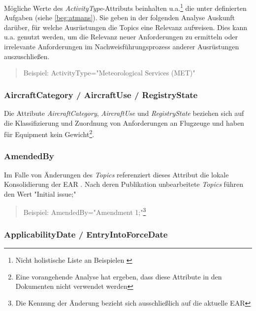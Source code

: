     Mögliche Werte des \textit{ActivityType}-Attributs beinhalten u.a.\footnote{Nicht holistische Liste an Beispielen \cite[vgl.][S.18 -- 19]{easa_xml_doc}} die unter \atmans{} definierten Aufgaben (siehe \ref{beg:atmans}).
    Sie geben in der folgenden Analyse Auskunft darüber, für welche \atmans Ausrüstungen die Topics eine Relevanz aufweisen.
    Dies kann u.a. genutzt werden, um die Relevanz neuer Anforderungen zu ermitteln oder irrelevante Anforderungen im Nachweisführungsprozess anderer Ausrüstungen auszuschließen.  
    
    \begin{quote}
        Beispiel:
        \textsf{ActivityType="Meteorological Services (MET)"}
    \end{quote}
   
\subsubsection{AircraftCategory / AircraftUse / RegistryState}
    
    Die Attribute \textit{AircraftCategory}, \textit{AircraftUse} und \textit{RegistryState} beziehen sich auf die Klassifizierung und Zuordnung von Anforderungen an Flugzeuge und haben für \atmans{} Equipment kein Gewicht\footnote{Eine vorangehende Analyse hat ergeben, dass diese Attribute in den \atmans Dokumenten nicht verwendet werden}. \cite[20, 21, 26]{easa_xml_doc}
    
\subsubsection{AmendedBy}

    Im Falle von Änderungen des \textit{Topics} referenziert dieses Attribut die lokale Konsolidierung der \ac{EAR}
    \cite[21]{easa_xml_doc}.
    Nach deren Publikation unbearbeitete \textit{Topics} führen den Wert \textsf{"{}Initial issue;"}
    
    \begin{quote}
        Beispiel:
        \textsf{AmendedBy="{}Amendment 1;"}\footnote{Die Kennung der Änderung bezieht sich ausschließlich auf die aktuelle \ac{EAR}}
    \end{quote}
    
\subsubsection{ApplicabilityDate / EntryIntoForceDate }

